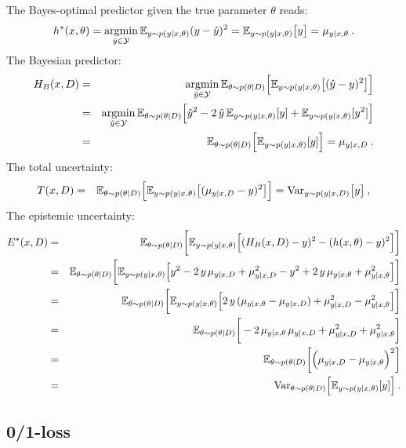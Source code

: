 The Bayes-optimal predictor given the true parameter $\theta$ reads:
\[ h^*(x,\theta) = 
  \mathop{\rm argmin}_{\hat{y}\in{\cal Y}}{\mathbb{E}}_{y\sim p(y\mid x,\theta)} (y-\hat{y})^2 = {\mathbb{E}}_{y\sim p(y|x,\theta)}\big[ y\big ] = \mu_{y|x,\theta}\:.      
\]
The Bayesian predictor:
\begin{eqnarray*}
   H_B(x,D) &= &
\mathop{\rm argmin}_{\hat{y}\in{\cal Y}} {\mathbb{E}}_{\theta\sim p(\theta|D)} \Big [{\mathbb{E}}_{y\sim p(y|x,\theta)}\big[ (\hat{y}-y)^2 \big ]\Big ]    \\
   &=& \mathop{\rm argmin}_{\hat{y}\in{\cal Y}} {\mathbb{E}}_{\theta\sim p(\theta|D)} \Big [
   \hat{y}^2-2\,\hat{y}\,{\mathbb{E}}_{y\sim p(y|x,\theta)}[y] + 
   {\mathbb{E}}_{y\sim p(y|x,\theta)}[y^2] \Big ]
   \\
  &= &{\mathbb{E}}_{\theta\sim p(\theta|D)}\Big[{\mathbb{E}}_{y\sim p(y|x,\theta)}[y] \Big ] =  \mu_{y|x,D}\:.
\end{eqnarray*}
%
The total uncertainty:
\begin{eqnarray*}
   T(x,D) &= &{\mathbb{E}}_{\theta\sim p(\theta|D)} \Big [{\mathbb{E}}_{y\sim p(y|x,\theta)}\big[ (\mu_{y|x,D}-y)^2 \big ]\Big ] = {\rm Var}_{y\sim p(y|x,D)}\big [ y\big ]\:,
\end{eqnarray*}
%
The epistemic uncertainty:
\begin{eqnarray*}
   E^*(x,D) &= &{\mathbb{E}}_{\theta\sim p(\theta|D)} \bigg [{\mathbb{E}}_{y\sim p(y|x,\theta)}\Big[ (H_B(x,D)-y)^2-(h(x,\theta)-y)^2 \Big ]\bigg ]\\
   &= &{\mathbb{E}}_{\theta\sim p(\theta|D)} \bigg [{\mathbb{E}}_{y\sim p(y|x,\theta)}\Big[ y^2-2\,y\,\mu_{y|x,D} + \mu_{y|x,D}^2-y^2+
   2\,y\,\mu_{y|x,\theta}+  \mu_{y|x,\theta}^2 \Big ]\bigg ]\\   
   &= &{\mathbb{E}}_{\theta\sim p(\theta|D)} \bigg [{\mathbb{E}}_{y\sim p(y|x,\theta)}\Big[ 2\,y\,(\mu_{y|x,\theta} - \mu_{y|x,D})+
   \mu_{y|x,D}^2-  \mu_{y|x,\theta}^2 \Big ]\bigg ]\\   
   &= &{\mathbb{E}}_{\theta\sim p(\theta|D)} \bigg [ -2\,\mu_{y|x,\theta}\,\mu_{y|x,D} + \mu_{y|x,D}^2+
   \mu_{y|x,\theta}^2\bigg ]\\   
   &= &{\mathbb{E}}_{\theta\sim p(\theta|D)} \bigg [ \Big(\mu_{y|x,D}-\mu_{y|x,\theta}\Big)^2 \bigg ]\\   
   &=& 
   {\rm Var}_{\theta\sim p(\theta|D)} \Big [ {\mathbb{E}}_{y\sim p(y|x,\theta)}[y] \Big ] \:.   
\end{eqnarray*}

\subsection*{0/1-loss}

